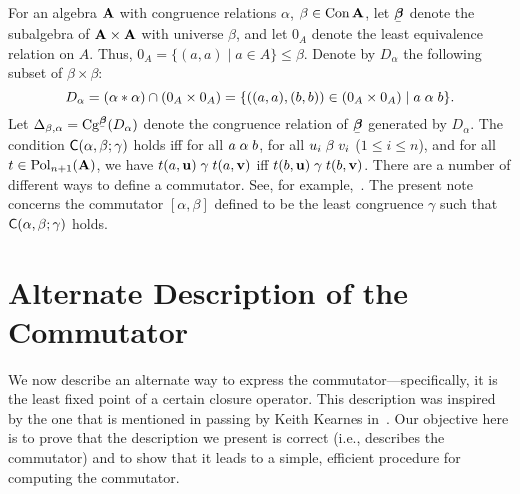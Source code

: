 For an algebra $\mathbf{A}$ with congruence relations $\alpha$, $\beta\in \operatorname{Con}\mathbf{A}$,
let $\bbeta$ denote the subalgebra of $\mathbf{A}\times \mathbf{A}$ with universe 
$\beta$, and let $0_A$ denote the least equivalence relation on $A$.
Thus, $0_A = \{(a,a) \mid a\in A\} \leq \beta$.
Denote by $D_\alpha$ the following subset of $\beta \times \beta$:
\begin{equation}
  \label{eq:9009}
D_\alpha =(\alpha \ast \alpha) \cap (0_A \times 0_A)
= \{((a,a), (b,b)) \in (0_A \times 0_A) \mid a\mathrel{\alpha} b\}.
\end{equation}
Let $\Delta_{\beta, \alpha} = \Cg^{\bbeta}(D_\alpha)$ denote the congruence relation
of $\bbeta$ generated by $D_\alpha$.
The condition $\mathsf{C}(\alpha, \beta; \gamma)$
holds iff for all $a \mathrel{\alpha} b$, for all $u_i \mathrel{\beta} v_i$ ($1\leq i\leq n$), and for all 
$t\in \operatorname{Pol}_{n+1}(\mathbf{A})$, we have
$t(a,\mathbf{u}) \mathrel{\gamma} t(a, \mathbf{v})$
iff $t(b,\mathbf{u}) \mathrel{\gamma} t(b, \mathbf{v})$.
There are a number of different ways to define a commutator.
See, for example,~\cite{MR0432511,MR541622,MR590312,MR1145556,MR1663558,MR1257643}.
The present note concerns the commutator $[\alpha, \beta]$ defined to be the least
congruence $\gamma$ such that $\mathsf{C}(\alpha, \beta; \gamma)$ holds.
\begin{comment}
Occasionally it is more convenient to write such an equivalence as a (two-way) derivation tree,
as follows:
\[
\infer=[\CC{\alpha}{\beta}{\gamma}]{\Gamma \vdash t(b,\bu) \mathrel{\gamma} t(b, \bv)}{\Gamma \vdash t(a,\bu) \mathrel{\gamma} t(a, \bv)}\]
where $\Gamma$ is a context containing
$a \alphar b$, $u_i \betar v_i$ ($1\leq i\leq n$), and 
$t\in \Pol_{n+1}(\bA)$.
\end{comment}

\section{Alternate Description of the Commutator}
\label{sec:altern-descr}

We now %
describe an alternate way to express the commutator---specifically,
it is the least fixed point of a certain closure operator.
This description was inspired by the one that is mentioned in passing by
Keith Kearnes in~\cite[p.~930]{MR1358491}.  Our objective here is
to prove that the description we present is correct (i.e., describes the commutator)
and to show that it leads to a simple, efficient procedure for computing the commutator.

